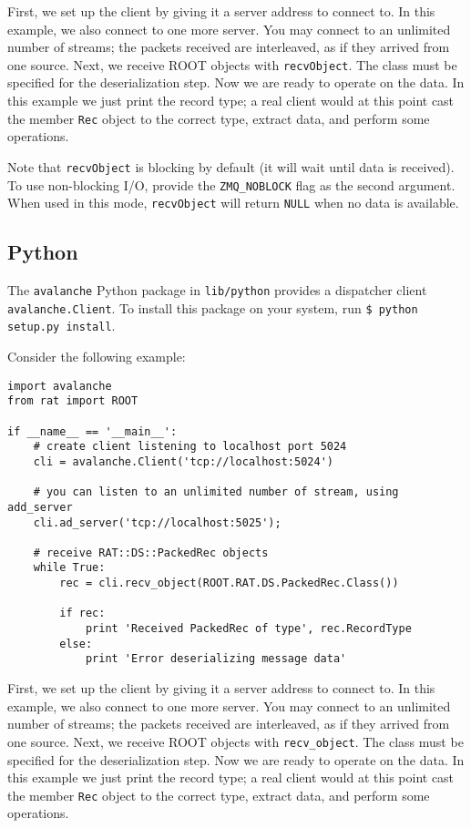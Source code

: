 \documentclass{article}
\begin{document}
First, we set up the client by giving it a server address to connect to. In this example, we also connect to one more server. You may connect to an unlimited number of streams; the packets received are interleaved, as if they arrived from one source. Next, we receive ROOT objects with {\tt recvObject}. The class must be specified for the deserialization step. Now we are ready to operate on the data. In this example we just print the record type; a real client would at this point cast the member {\tt Rec} object to the correct type, extract data, and perform some operations.

Note that {\tt recvObject} is blocking by default (it will wait until data is received). To use non-blocking I/O, provide the {\tt ZMQ\_NOBLOCK} flag as the second argument. When used in this mode, {\tt recvObject} will return {\tt NULL} when no data is available.

\subsection{Python}
The {\tt avalanche} Python package in {\tt lib/python} provides a dispatcher client {\tt avalanche.Client}. To install this package on your system, run {\tt \$ python setup.py install}.

Consider the following example:

\begin{verbatim}
import avalanche
from rat import ROOT

if __name__ == '__main__':
    # create client listening to localhost port 5024
    cli = avalanche.Client('tcp://localhost:5024')

    # you can listen to an unlimited number of stream, using add_server
    cli.ad_server('tcp://localhost:5025');

    # receive RAT::DS::PackedRec objects
    while True:
        rec = cli.recv_object(ROOT.RAT.DS.PackedRec.Class())

        if rec:
            print 'Received PackedRec of type', rec.RecordType
        else:
            print 'Error deserializing message data'
\end{verbatim}
First, we set up the client by giving it a server address to connect to. In this example, we also connect to one more server. You may connect to an unlimited number of streams; the packets received are interleaved, as if they arrived from one source. Next, we receive ROOT objects with {\tt recv\_object}. The class must be specified for the deserialization step. Now we are ready to operate on the data. In this example we just print the record type; a real client would at this point cast the member {\tt Rec} object to the correct type, extract data, and perform some operations.
\end{document}
